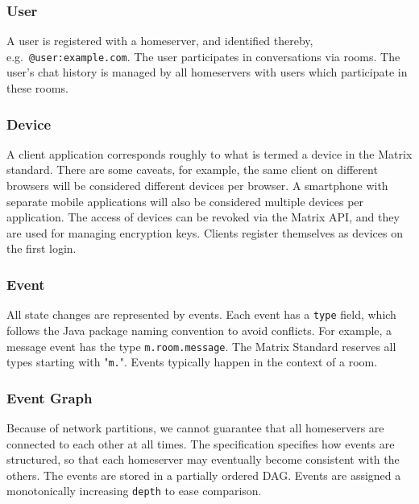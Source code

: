 \subsubsection{User}
A user is registered with a homeserver, and identified thereby, e.g.~\texttt{@user:example.com}.
The user participates in conversations via rooms.
The user's chat history is managed by all homeservers with users which participate in these rooms.

\subsubsection{Device}
A client application corresponds roughly to what is termed a device in the Matrix standard.
There are some caveats, for example, the same client on different browsers will be considered different devices per browser.
A smartphone with separate mobile applications will also be considered multiple devices per application.
The access of devices can be revoked via the Matrix \ac{API}, and they are used for managing encryption keys.
Clients register themselves as devices on the first login.

\subsubsection{Event}
All state changes are represented by events.
Each event has a \texttt{type} field, which follows the Java package naming convention to avoid conflicts.
For example, a message event has the type \texttt{m.room.message}.
The Matrix Standard reserves all types starting with "\texttt{m.}".
Events typically happen in the context of a room.

\subsubsection{Event Graph}
Because of network partitions, we cannot guarantee that all homeservers are connected to each other at all times.
The specification specifies how events are structured, so that each homeserver may eventually become consistent with the others.
The events are stored in a partially ordered \ac{DAG}.
Events are assigned a monotonically increasing \texttt{depth} to ease comparison.

